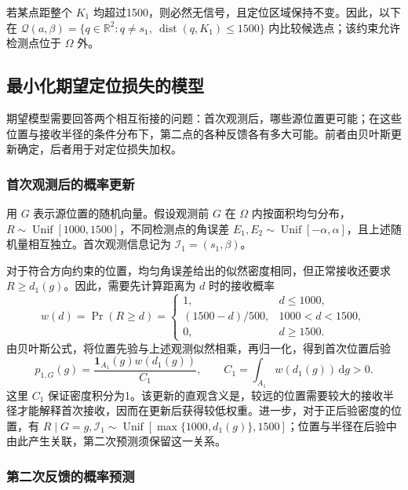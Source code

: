 若某点距整个 \(K_1\) 均超过1500，则必然无信号，且定位区域保持不变。因此，以下在 \(\mathcal Q(a,\beta)=\{q\in\mathbb R^2:q\ne s_1,\ \operatorname{dist}(q,K_1)\le1500\}\) 内比较候选点；该约束允许检测点位于 \(\Omega\) 外。

\subsection{最小化期望定位损失的模型}

期望模型需要回答两个相互衔接的问题：首次观测后，哪些源位置更可能；在这些位置与接收半径的条件分布下，第二点的各种反馈各有多大可能。前者由贝叶斯更新确定，后者用于对定位损失加权。

\subsubsection{首次观测后的概率更新}

用 \(G\) 表示源位置的随机向量。假设观测前 \(G\) 在 \(\Omega\) 内按面积均匀分布，\(R\sim\operatorname{Unif}[1000,1500]\)，不同检测点的角误差 \(E_1,E_2\sim\operatorname{Unif}[-\alpha,\alpha]\)，且上述随机量相互独立。首次观测信息记为 \(\mathcal I_1=(s_1,\beta)\)。

对于符合方向约束的位置，均匀角误差给出的似然密度相同，但正常接收还要求 \(R\ge d_1(g)\)。因此，需要先计算距离为 \(d\) 时的接收概率
\begin{equation}
 w(d)=\Pr(R\ge d)=
 \begin{cases}
 1,&d\le1000,\\
 (1500-d)/500,&1000<d<1500,\\
 0,&d\ge1500.
 \end{cases}
\label{eq:q2-pair-weight}
\end{equation}
由贝叶斯公式，将位置先验与上述观测似然相乘，再归一化，得到首次位置后验
\begin{equation}
 p_{1,G}(g)=\frac{\mathbf1_{A_1}(g)w(d_1(g))}{C_1},
 \qquad C_1=\int_{A_1}w(d_1(g))\,\mathrm dg>0.
\label{eq:q2-pair-posterior}
\end{equation}
这里 \(C_1\) 保证密度积分为1。该更新的直观含义是，较远的位置需要较大的接收半径才能解释首次接收，因而在更新后获得较低权重。进一步，对于正后验密度的位置，有 \(R\mid G=g,\mathcal I_1\sim\operatorname{Unif}[\max\{1000,d_1(g)\},1500]\)；位置与半径在后验中由此产生关联，第二次预测须保留这一关系。

\subsubsection{第二次反馈的概率预测}

